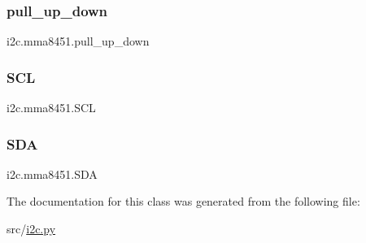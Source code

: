\subsubsection{\texorpdfstring{pull\+\_\+up\+\_\+down}{pull\_up\_down}}
{\footnotesize\ttfamily i2c.\+mma8451.\+pull\+\_\+up\+\_\+down\hspace{0.3cm}{\ttfamily [static]}}

\mbox{\label{classi2c_1_1mma8451_adf12ccdab3e49465e7beb5ebb66f0444}} 
\subsubsection{\texorpdfstring{S\+CL}{SCL}}
{\footnotesize\ttfamily i2c.\+mma8451.\+S\+CL}

\mbox{\label{classi2c_1_1mma8451_a5fcacc327ae982eafebbefee1efbe80d}} 
\subsubsection{\texorpdfstring{S\+DA}{SDA}}
{\footnotesize\ttfamily i2c.\+mma8451.\+S\+DA}



The documentation for this class was generated from the following file\+:\begin{DoxyCompactItemize}
\item 
src/\hyperlink{i2c_8py}{i2c.\+py}\end{DoxyCompactItemize}
